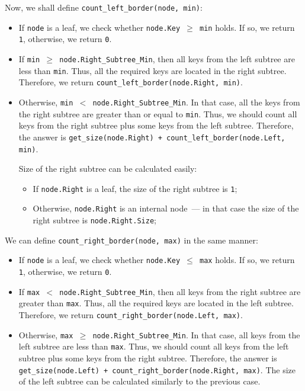 \documentclass[times, dvipsnames,%
               languages={russian,english} %
              ]{itmo-student-thesis}
\begin{document}
\bigbreak

Now, we shall define \texttt{count\_left\_border(node, min)}:

\begin{itemize}
    \item If \texttt{node} is a leaf, we check whether \texttt{node.Key $\geq$ min} holds. If so, we return \texttt{1}, otherwise, we return \texttt{0}.
    
    \item If \texttt{min $\geq$ node.Right\_Subtree\_Min}, then all keys from the left subtree are less than \texttt{min}. Thus, all the required keys are located in the right subtree. Therefore, we return \texttt{count\_left\_border(node.Right, min)}.
    
    \item Otherwise, \texttt{min $<$ node.Right\_Subtree\_Min}. In that case, all the keys from the right subtree are greater than or equal to \texttt{min}. Thus, we should count all keys from the right subtree plus some keys from the left subtree. Therefore, the answer is \texttt{get\_size(node.Right) + count\_left\_border(node.Left, min)}.
    
    Size of the right subtree can be calculated easily:
    
    \begin{itemize}
        \item If \texttt{node.Right} is a leaf, the size of the right subtree is \texttt{1};
        
        \item Otherwise, \texttt{node.Right} is an internal node~--- in that case the size of the right subtree is \texttt{node.Right.Size};
    \end{itemize}
\end{itemize}

\bigbreak

We can define \texttt{count\_right\_border(node, max)} in the same manner:

\begin{itemize}
    \item If \texttt{node} is a leaf, we check whether \texttt{node.Key $\leq$ max} holds. If so, we return \texttt{1}, otherwise, we return \texttt{0}.
    
    \item If \texttt{max $<$ node.Right\_Subtree\_Min}, then all keys from the right subtree are greater than \texttt{max}. Thus, all the required keys are located in the left subtree. Therefore, we return \texttt{count\_right\_border(node.Left, max)}.
    
    \item Otherwise, \texttt{max $\geq$ node.Right\_Subtree\_Min}. In that case, all keys from the left subtree are less than \texttt{max}. Thus, we should count all keys from the left subtree plus some keys from the right subtree. Therefore, the answer is \texttt{get\_size(node.Left) + count\_right\_border(node.Right, max)}. The size of the left subtree can be calculated similarly to the previous case.
\end{itemize}
\end{document}
